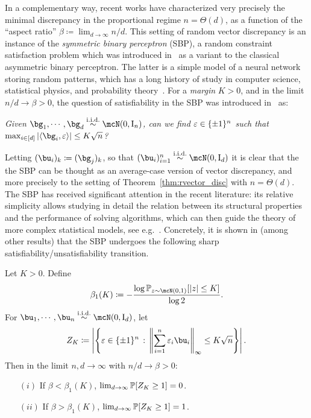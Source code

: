 \myskip
In a complementary way, 
recent works have characterized
very precisely the minimal discrepancy in the proportional regime $n = \Theta(d)$, as a function of the ``aspect ratio'' $\beta \coloneqq \lim_{d \to \infty} n/d$.
This setting of random vector discrepancy is an instance of the \emph{symmetric binary perceptron} (SBP), a random constraint satisfaction problem 
which was introduced in~\cite{aubin2019storage}
as a variant to the classical asymmetric binary perceptron. 
The latter is  
a simple model of a neural network storing random patterns, which has a long history of study in 
computer science, statistical physics, and probability theory~\citep{cover1965geometrical,gardner1988space,gardner1988optimal,krauth1989storage,sompolinsky1990learning,talagrand1999intersecting,talagrand2010mean}.
For a \emph{margin} $K > 0$, and in the limit $n/d \to \beta > 0$, the question of satisfiability in the SBP was introduced in~\cite{aubin2019storage} 
as:
\begin{center}
   \textit{
    Given $\bg_1, \cdots, \bg_d \iid \mcN(0, \Id_n)$, can we find $\varepsilon \in \{\pm 1\}^n$ 
    such that $\max_{i \in [d]}|\langle \bg_i, \eps \rangle| \leq K \sqrt{n}$? 
   }
\end{center}
Letting $(\bu_i)_k \coloneqq (\bg_j)_k$, so that $(\bu_i)_{i=1}^n \iid \mcN(0, \Id_d)$ it is clear that the 
the SBP can be thought as an average-case version of vector discrepancy, 
and more precisely to the setting of Theorem~\ref{thm:rvector_disc} with $n = \Theta(d)$.
The SBP has received significant attention in the recent literature:
its relative simplicity allows studying in detail the relation between its structural properties and the performance of 
solving algorithms, 
which can then guide the theory of more complex statistical models,
see e.g.\ \cite{aubin2019storage,perkins2021frozen,abbe2022proof,gamarnik2022algorithms,kizildag2023symmetric,barbier2024atypical,alaoui2024hardness,barbier2024escape}.
Concretely, it is shown in \cite{aubin2019storage,abbe2022proof,gamarnik2022algorithms} (among other results) that 
the SBP undergoes the following sharp satisfiability/unsatisfiability transition.
\begin{theorem}\label{thm:trans_SBP}
    Let $K > 0$.
    Define
    \begin{equation*}
        \beta_1(K) \coloneqq - \frac{\log \bbP_{z \sim \mcN(0,1)}[|z| \leq K]}{\log 2}.
    \end{equation*}
    For $\bu_1, \cdots, \bu_n \iid \mcN(0, \Id_d)$,
    let 
    \begin{equation*}
        Z_K \coloneqq \left|\left\{\eps \in \{\pm 1\}^n \, : \, \left\|\sum_{i=1}^n \eps_i \bu_i \right\|_\infty \leq K \sqrt{n}\right\}\right|.
    \end{equation*}
    Then in the limit $n, d \to \infty$ with $n / d \to \beta > 0$:
    \begin{itemize}
        \item[$(i)$] If $\beta < \beta_1(K)$, $\lim_{d \to \infty} \mathbb{P}[Z_K \geq 1] = 0$. 
        \item[$(ii)$] If $\beta > \beta_1(K)$, $\lim_{d \to \infty} \mathbb{P}[Z_K \geq 1] = 1$. 
    \end{itemize}
\end{theorem} 
